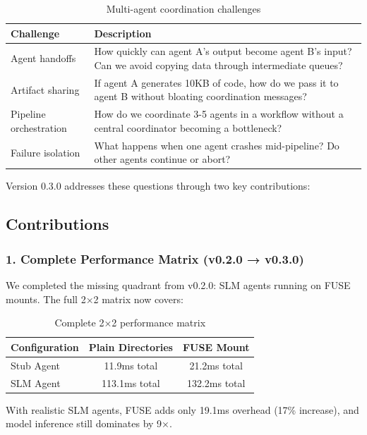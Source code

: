 \documentclass[11pt]{article}
\begin{document}
\begin{table}[h]
\centering
\begin{tabular}{p{4cm}p{9cm}}
\toprule
\textbf{Challenge} & \textbf{Description} \\
\midrule
Agent handoffs & How quickly can agent A's output become agent B's input? Can we avoid copying data through intermediate queues? \\
Artifact sharing & If agent A generates 10KB of code, how do we pass it to agent B without bloating coordination messages? \\
Pipeline orchestration & How do we coordinate 3-5 agents in a workflow without a central coordinator becoming a bottleneck? \\
Failure isolation & What happens when one agent crashes mid-pipeline? Do other agents continue or abort? \\
\bottomrule
\end{tabular}
\caption{Multi-agent coordination challenges}
\end{table}

Version 0.3.0 addresses these questions through two key contributions:

\subsection{Contributions}

\subsubsection{1. Complete Performance Matrix (v0.2.0 → v0.3.0)}

We completed the missing quadrant from v0.2.0: SLM agents running on FUSE mounts. The full 2×2 matrix now covers:

\begin{table}[h]
\centering
\begin{tabular}{lcc}
\toprule
\textbf{Configuration} & \textbf{Plain Directories} & \textbf{FUSE Mount} \\
\midrule
Stub Agent & 11.9ms total & 21.2ms total \\
SLM Agent & 113.1ms total & 132.2ms total \\
\bottomrule
\end{tabular}
\caption{Complete 2×2 performance matrix}
\end{table}

With realistic SLM agents, FUSE adds only 19.1ms overhead (17\% increase), and model inference still dominates by 9×.
\end{document}
